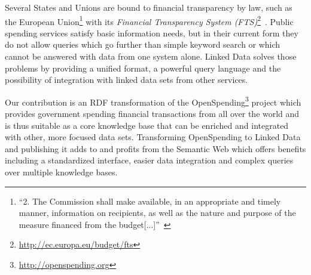 \documentclass[sw]{iosart2x}
\begin{document}
Several States and Unions are bound to financial transparency by law, such as the European Union\footnote{\enquote{2. The Commission shall make available, in an appropriate
and timely manner, information on recipients, as well as the nature and purpose of the measure financed from the budget[...]}~\cite{euregulations}} with its \emph{Financial Transparency System (FTS)}\footnote{\url{http://ec.europa.eu/budget/fts}}~\cite{martin-fts}.
Public spending services satisfy basic information needs, but in their current form they do not allow queries which go further than simple keyword search or which cannot be answered with data from one system alone.
Linked Data solves those problems by providing a unified format, a powerful query language and the possibility of integration with linked data sets from other services.

Our contribution is an RDF transformation of the OpenSpending\footnote{\url{http://openspending.org}} project which provides government spending financial transactions from all over the world and is thus suitable as a core knowledge base that can be enriched and integrated with other, more focused data sets.
Transforming OpenSpending to Linked Data and publishing it adds to and profits from the Semantic Web which offers benefits including a standardized interface, easier data integration and complex queries over multiple knowledge bases.



\end{document}
